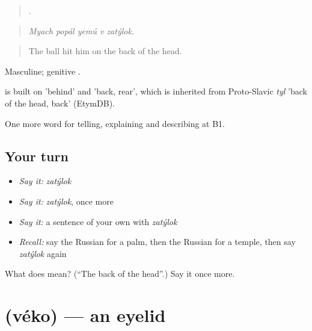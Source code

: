 \begin{quote}
    .
\end{quote}

\begin{quote}
\emph{Myach popál yemú v zatýlok.}
\end{quote}

\begin{quote}
The ball hit him on the back of the head.
\end{quote}

Masculine; genitive .

\begin{cousinweb}
\emph{} is built on \emph{} 'behind' and \emph{} 'back, rear', which is inherited from Proto-Slavic \emph{tyl} 'back of the head, back' (EtymDB).
\end{cousinweb}

\begin{grammarlens}[title={What you've built}]
One more word for telling, explaining and describing at B1.
\end{grammarlens}

\subsection*{Your turn}
\begin{itemize}
\raggedright
  \item \emph{Say it:} \emph{zatýlok}
  \item \emph{Say it:} \emph{zatýlok}, once more
  \item \emph{Say it:} a sentence of your own with \emph{zatýlok}
  \item \emph{Recall:} say the Russian for a palm, then the Russian for a temple, then say \emph{zatýlok} again
\end{itemize}

\begin{tcolorbox}[breakable,colback=teal!4,colframe=teal!35!black,title={Before you move on}]
What does  mean? (\textquotedblleft{}The back of the head\textquotedblright{}.) Say it once more.
\end{tcolorbox}
\section[\texorpdfstring{\ru{веко} (véko)}{веко (véko)}]{ (véko) — an eyelid}

\label{lesson:RU-C482-veko}



